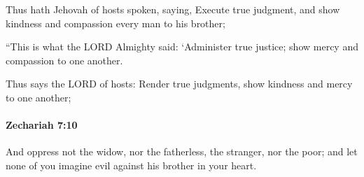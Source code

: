 			\begin{versebox}
					\item[BHS] 
					\item[LXX] 
					\item[ASV] Thus hath Jehovah of hosts spoken, saying, Execute true judgment, and show kindness and compassion every man to his brother;
					\item[NIV] “This is what the LORD Almighty said: ‘Administer true justice; show mercy and compassion to one another.
					\item[NRSV] Thus says the LORD of hosts: Render true judgments, show kindness and mercy to one another;
			\end{versebox}

		\paragraph{Zechariah 7:10} %
			\label{ZECHARIAH-7-10}

			And oppress not the widow, nor the fatherless, the stranger, nor the poor; and let none of you imagine evil against his brother in your heart.

